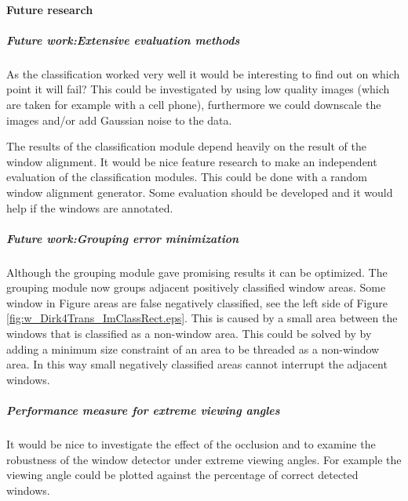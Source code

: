 \paragraph{Future research} %
\label{sec:futureResearchWindowClassification}
\subparagraph{Future work:Extensive evaluation methods}
As the classification worked very well it would be interesting to find out on which
point it will fail?  This could be investigated by using low quality images (which are taken for
example with a cell phone), furthermore we could downscale the images and/or add
Gaussian noise to the data.\\

The results of the classification module depend heavily on the result of the
window alignment. It would be nice feature research to make an independent
evaluation of the classification modules.  This could be done with a random
window alignment generator. Some evaluation should be developed and it would
help if the windows are annotated.

\subparagraph{Future work:Grouping error minimization}
Although the grouping module gave promising results it can be optimized.  The
grouping module now groups adjacent positively classified window areas.  Some
window in Figure areas are false negatively classified, see the left side of
Figure \ref{fig:w_Dirk4Trans_ImClassRect.eps}.  This is caused by a small area
between the windows that is classified as a non-window area. This could be
solved by by adding a minimum size constraint of an area to be threaded as a
non-window area.  In this way small negatively classified areas cannot interrupt
the adjacent windows.

\subparagraph{Performance measure for extreme viewing angles}
It would be nice to investigate the effect of the occlusion and to examine the
robustness of the window detector under extreme viewing angles.
For example the viewing angle could be plotted against the percentage of
correct detected windows.







